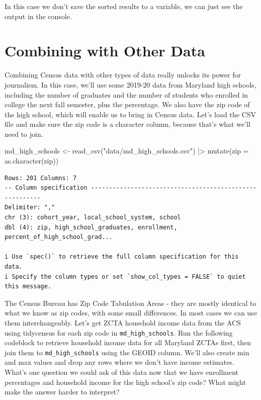 \documentclass[
  letterpaper,
  DIV=11,
  numbers=noendperiod]{scrreprt}
\newenvironment{Shaded}{\begin{snugshade}}{\end{snugshade}}
\newcommand{\AttributeTok}[1]{\textcolor[rgb]{0.40,0.45,0.13}{#1}}
\newcommand{\FunctionTok}[1]{\textcolor[rgb]{0.28,0.35,0.67}{#1}}
\newcommand{\NormalTok}[1]{\textcolor[rgb]{0.00,0.23,0.31}{#1}}
\newcommand{\OtherTok}[1]{\textcolor[rgb]{0.00,0.23,0.31}{#1}}
\newcommand{\SpecialCharTok}[1]{\textcolor[rgb]{0.37,0.37,0.37}{#1}}
\newcommand{\StringTok}[1]{\textcolor[rgb]{0.13,0.47,0.30}{#1}}
\begin{document}
In this case we don't save the sorted results to a variable, we can just
see the output in the console.

\hypertarget{combining-with-other-data}{%
\section{Combining with Other Data}\label{combining-with-other-data}}

Combining Census data with other types of data really unlocks its power
for journalism. In this case, we'll use some 2019-20 data from Maryland
high schools, including the number of graduates and the number of
students who enrolled in college the next fall semester, plus the
percentage. We also have the zip code of the high school, which will
enable us to bring in Census data. Let's load the CSV file and make sure
the zip code is a character column, because that's what we'll need to
join.

\begin{Shaded}
\begin{Highlighting}[]
\NormalTok{md\_high\_schools }\OtherTok{\textless{}{-}} \FunctionTok{read\_csv}\NormalTok{(}\StringTok{"data/md\_high\_schools.csv"}\NormalTok{) }\SpecialCharTok{|\textgreater{}}
  \FunctionTok{mutate}\NormalTok{(}\AttributeTok{zip =} \FunctionTok{as.character}\NormalTok{(zip))}
\end{Highlighting}
\end{Shaded}

\begin{verbatim}
Rows: 201 Columns: 7
-- Column specification --------------------------------------------------------
Delimiter: ","
chr (3): cohort_year, local_school_system, school
dbl (4): zip, high_school_graduates, enrollment, percent_of_high_school_grad...

i Use `spec()` to retrieve the full column specification for this data.
i Specify the column types or set `show_col_types = FALSE` to quiet this message.
\end{verbatim}

The Census Bureau has Zip Code Tabulation Areas - they are mostly
identical to what we know as zip codes, with some small differences. In
most cases we can use them interchangeably. Let's get ZCTA household
income data from the ACS using tidycensus for each zip code in
\texttt{md\_high\_schools}. Run the following codeblock to retrieve
household income data for all Maryland ZCTAs first, then join them to
\texttt{md\_high\_schools} using the GEOID column. We'll also create min
and max values and drop any rows where we don't have income estimates.
What's one question we could ask of this data now that we have
enrollment percentages and household income for the high school's zip
code? What might make the answer harder to interpret?
\end{document}
